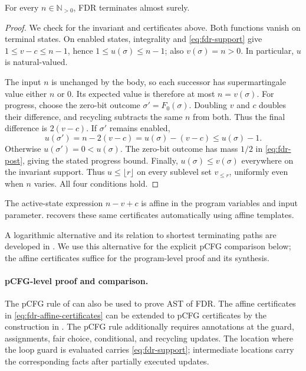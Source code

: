 \begin{theorem}
\label{thm:fdr}
For every $n\in\mathbb N_{>0}$, FDR terminates almost surely.
\end{theorem}
\begin{proof}
We check  for the invariant and certificates
above. Both functions vanish on terminal states. On enabled states,
integrality and \eqref{eq:fdr-support} give
$1\leq v-c\leq n-1$, hence $1\leq u(\sigma)\leq n-1$;
also $v(\sigma)=n>0$. In particular, $u$ is natural-valued.

The input $n$ is unchanged by the body, so each successor has
supermartingale value either $n$ or $0$. Its expected value is
therefore at most $n=v(\sigma)$.
For progress, choose the zero-bit outcome $\sigma'=F_0(\sigma)$.
Doubling $v$ and $c$ doubles their difference, and recycling subtracts
the same $n$ from both. Thus the final difference is $2(v-c)$.
If $\sigma'$ remains enabled,
\[
 u(\sigma')=n-2(v-c)=u(\sigma)-(v-c)\leq u(\sigma)-1.
\]
Otherwise $u(\sigma')=0<u(\sigma)$. The zero-bit outcome has mass
$1/2$ in \eqref{eq:fdr-post}, giving the stated progress bound.
Finally, $u(\sigma)\leq v(\sigma)$ everywhere on the invariant
support. Thus $u\leq\lfloor r\rfloor$ on every sublevel set
$v_{\leq r}$, uniformly even when $n$ varies. All four conditions hold.
\end{proof}

The active-state expression $n-v+c$ is affine in the program variables
and input parameter.  recovers these same
certificates automatically using affine templates.

A logarithmic alternative and its relation to shortest terminating paths
are developed in . We use this alternative
for the explicit pCFG comparison below; the affine certificates suffice
for the program-level proof and its synthesis.

\paragraph{pCFG-level proof and comparison.}
The pCFG rule of  can also be used to prove
AST of FDR. The affine certificates in
\eqref{eq:fdr-affine-certificates} can be extended to pCFG certificates
by the construction in .
The pCFG rule additionally requires annotations at the guard,
assignments, fair choice, conditional, and recycling updates.
The location where the loop guard is evaluated carries
\eqref{eq:fdr-support}; intermediate locations carry the corresponding
facts after partially executed updates.

